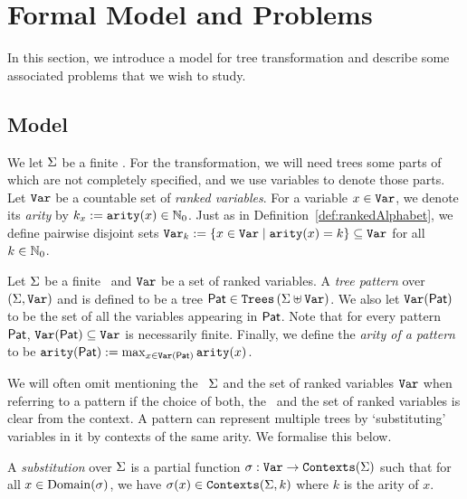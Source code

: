 \section{Formal Model and Problems}\label{sec:formalModelAndProblems_atomicTreeTransform}

In this section, we introduce a model for tree transformation and describe some associated problems that we wish to study.

\subsection{Model}\label{subsec:model_atomicTreeTransform}

We let $\Sigma$ be a finite \rab. For the transformation, we will need trees some parts of which are not completely specified, and we use variables to denote those parts. Let $\texttt{Var}$ be a countable set of \emph{ranked variables}. For a variable $x \in \texttt{Var}$, we denote its \emph{arity} by $k_x := \texttt{arity}(x) \in \mathbb{N}_0$. Just as in Definition~\ref{def:rankedAlphabet}, we define pairwise disjoint sets $\texttt{Var}_k := \left\{ x \in \texttt{Var} \mid \texttt{arity}(x) = k \right\} \subseteq \texttt{Var}$ for all $k \in \mathbb{N}_0$.

\begin{definition}\label{def:treePattern}
    Let $\Sigma$ be a finite \rab\ and $\texttt{Var}$ be a set of ranked variables. A \emph{tree pattern} over $(\Sigma, \texttt{Var})$ and is defined to be a tree $\mathsf{Pat} \in \texttt{Trees}\left(\Sigma \uplus \texttt{Var}\right)$. We also let $\texttt{Var}(\mathsf{Pat})$ to be the set of all the variables appearing in $\mathsf{Pat}$. Note that for every pattern $\mathsf{Pat}$, $\texttt{Var}(\mathsf{Pat}) \subseteq \texttt{Var}$ is necessarily finite. Finally, we define the \emph{arity of a pattern} to be $\texttt{arity}(\mathsf{Pat}) := \max_{x \in \texttt{Var}(\mathsf{Pat})}\texttt{arity}(x)$. 
\end{definition}


We will often omit mentioning the \rab\ $\Sigma$ and the set of ranked variables $\texttt{Var}$ when referring to a pattern if the choice of both, the \rab\ and the set of ranked variables is clear from the context.
A pattern can represent multiple trees by `substituting' variables in it by contexts of the same arity. We formalise this below.

\begin{definition}[Substitution]\label{def:substitution}
    A \emph{substitution} over $\Sigma$ is a partial function $\sigma : \texttt{Var} \to \texttt{Contexts}(\Sigma)$ such that for all $x \in \operatorname{Domain}(\sigma)$, we have $\sigma(x) \in \texttt{Contexts}(\Sigma, k)$ where $k$ is the arity of $x$.
\end{definition}

